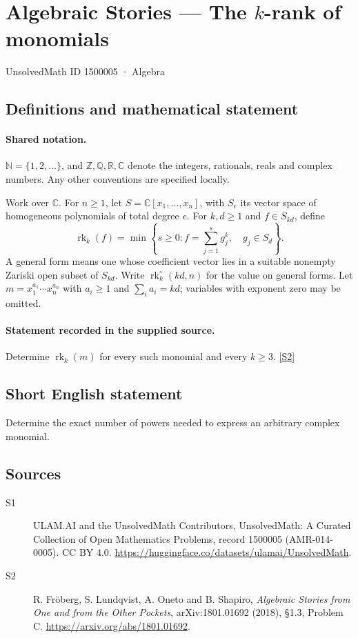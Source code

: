\documentclass[11pt]{article}
\newcommand{\sref}[2]{\hyperlink{source:#1:#2}{[S#2]}}
\begin{document}
\setcounter{section}{1500004}
\section{Algebraic Stories — The $k$-rank of monomials}\label{1500005}
{\small\sffamily UnsolvedMath ID 1500005 · Algebra}
\subsection{Definitions and mathematical statement}

\paragraph{Shared notation.}$\mathbb N=\{1,2,\ldots\}$, and $\mathbb Z,\mathbb Q,\mathbb R,\mathbb C$ denote the integers, rationals, reals and complex numbers. Any other conventions are specified locally.


Work over $\mathbb C$. For $n\geq1$, let $S=\mathbb C[x_1,\ldots,x_n]$, with $S_e$ its vector space of homogeneous polynomials of total degree $e$. For $k,d\geq1$ and $f\in S_{kd}$, define
\[\operatorname{rk}_k(f)=\min\left\{s\geq0:f=\sum_{j=1}^{s}g_j^k,\quad g_j\in S_d\right\}.
\]
A general form means one whose coefficient vector lies in a suitable nonempty Zariski open subset of $S_{kd}$. Write $\operatorname{rk}_k^\circ(kd,n)$ for the value on general forms. Let $m=x_1^{a_1}\cdots x_n^{a_n}$ with $a_i\geq1$ and $\sum_i a_i=kd$; variables with exponent zero may be omitted.
\paragraph{Statement recorded in the supplied source.}
Determine $\operatorname{rk}_k(m)$ for every such monomial and every $k\geq3$. \sref{1500005}{2}
\subsection{Short English statement}
Determine the exact number of powers needed to express an arbitrary complex monomial.
\subsection{Sources}
\begin{description}
\item[\hypertarget{source:1500005:1}{S1}] ULAM.AI and the UnsolvedMath Contributors, UnsolvedMath: A Curated Collection of Open Mathematics Problems, record 1500005 (AMR-014-0005). CC BY 4.0. \url{https://huggingface.co/datasets/ulamai/UnsolvedMath}.
\item[\hypertarget{source:1500005:2}{S2}] R. Fröberg, S. Lundqvist, A. Oneto and B. Shapiro, \emph{Algebraic Stories from One and from the Other Pockets}, arXiv:1801.01692 (2018), §1.3, Problem C. \url{https://arxiv.org/abs/1801.01692}.
\end{description}
\label{end:1500005}
\end{document}
